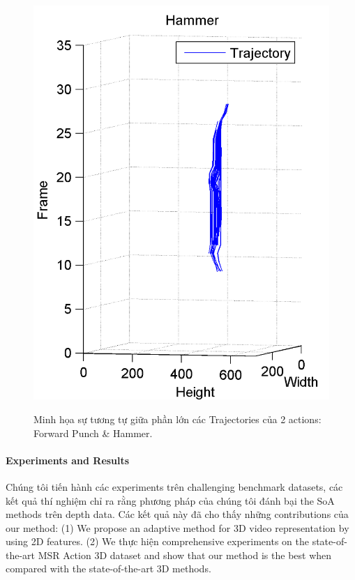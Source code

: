\documentclass[review]{elsarticle}
\begin{document}
\begin{figure}[ht]
\begin{center}
{			\includegraphics[scale=0.5]{Hammer_TOP.png}
		}
	\end{center}
	\caption{\label{fig:Illustration}Minh họa sự tương tự giữa phần lớn các Trajectories của 2 actions: Forward Punch \& Hammer.}
\end{figure}

\paragraph{Experiments and Results}Chúng tôi tiến hành các experiments trên challenging benchmark datasets, các kết quả thí nghiệm chỉ ra rằng phương pháp của chúng tôi đánh bại the SoA methods trên depth data. Các kết quả này đã cho thấy những contributions của our method: (1) We propose an adaptive method for 3D video representation by using 2D features. (2) We thực hiện comprehensive experiments on the state-of-the-art MSR Action 3D dataset and show that our method is the best when compared with the state-of-the-art 3D methods.
\end{document}
